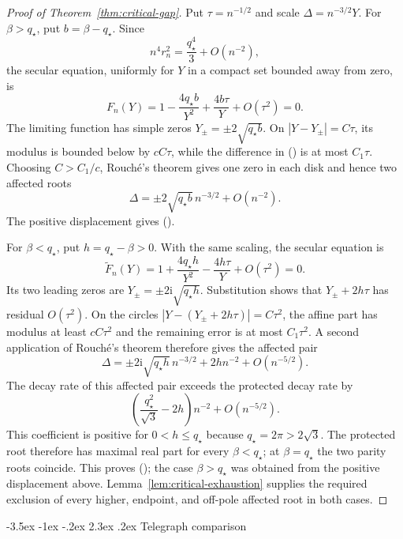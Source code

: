 \documentclass[twoside,10pt]{article}
\makeatletter
\numberwithin{equation}{section}
\theoremstyle{slbody}
\theoremstyle{definition}
\theoremstyle{remark}
\newcommand{\ii}{\mathrm i}
\renewcommand{\section}{%
  \@startsection{section}{1}{\z@}%
    {-3.5ex \@plus -1ex \@minus -.2ex}%
    {2.3ex \@plus .2ex}%
    {\normalfont\large\bfseries}}
\renewcommand{\eqref}[1]{%
  \textup{{\normalfont(\oldstylenums{\ref{#1}}}\normalfont)}}
\makeatother
\begin{document}
\begin{proof}[Proof of Theorem~\ref{thm:critical-gap}]
Put $\tau=n^{-1/2}$ and scale $\Delta=n^{-3/2}Y$.
For $\beta>q_\star$, put $b=\beta-q_\star$.  Since
\[
 n^4r_n^2=\frac{q_\star^4}{3}+O(n^{-2}),
\]
the secular equation, uniformly for $Y$ in a compact set bounded away
from zero, is
\begin{equation}\label{eq:critical-fast-scaled-secular}
 F_n(Y)=1-\frac{4q_\star b}{Y^2}+\frac{4b\tau}{Y}
             +O(\tau^2)=0.
\end{equation}
The limiting function has simple zeros
$Y_\pm=\pm2\sqrt{q_\star b}$.  On
$|Y-Y_\pm|=C\tau$, its modulus is bounded below by
$cC\tau$, while the difference in
\eqref{eq:critical-fast-scaled-secular} is at most $C_1\tau$.
Choosing $C>C_1/c$, Rouch\'e's theorem gives one zero in each disk and
hence two affected roots
\[
 \Delta=\mathord\pm2\sqrt{q_\star b}\,n^{-3/2}+O(n^{-2}).
\]
The positive displacement gives \eqref{eq:critical-at-fast}.

For $\beta<q_\star$, put $h=q_\star-\beta>0$.  With the same scaling, the secular
equation is
\begin{equation}\label{eq:critical-slow-scaled-secular}
 \widetilde F_n(Y)=1+\frac{4q_\star h}{Y^2}
                    -\frac{4h\tau}{Y}+O(\tau^2)=0.
\end{equation}
Its two leading zeros are $Y_\pm=\pm2\ii\sqrt{q_\star h}$.  Substitution shows
that $Y_\pm+2h\tau$ has residual $O(\tau^2)$.  On the circles
$|Y-(Y_\pm+2h\tau)|=C\tau^2$, the affine part has modulus at
least $cC\tau^2$ and the remaining error is at most
$C_1\tau^2$.  A second application of Rouch\'e's theorem therefore
gives the affected pair
\begin{equation}\label{eq:critical-slow-affected-pair}
 \Delta=\mathord\pm2\ii\sqrt{q_\star h}\,n^{-3/2}
        +2h n^{-2}+O(n^{-5/2}).
\end{equation}
The decay rate of this affected pair exceeds the protected decay rate by
\[
 \left(\frac{q_\star^2}{\sqrt3}-2h\right)n^{-2}+O(n^{-5/2}).
\]
This coefficient is positive for $0<h\le q_\star$ because
$q_\star=2\pi>2\sqrt3$.  The protected root therefore has maximal real
part for every $\beta<q_\star$; at $\beta=q_\star$ the two parity roots
coincide.  This proves
\eqref{eq:critical-at-slow}; the case $\beta>q_\star$ was obtained from the
positive displacement above.
Lemma~\ref{lem:critical-exhaustion} supplies the required exclusion of every
higher, endpoint, and off-pole affected root in both cases.
\end{proof}

\section{Telegraph comparison}\label{sec:telegraph}
\end{document}
